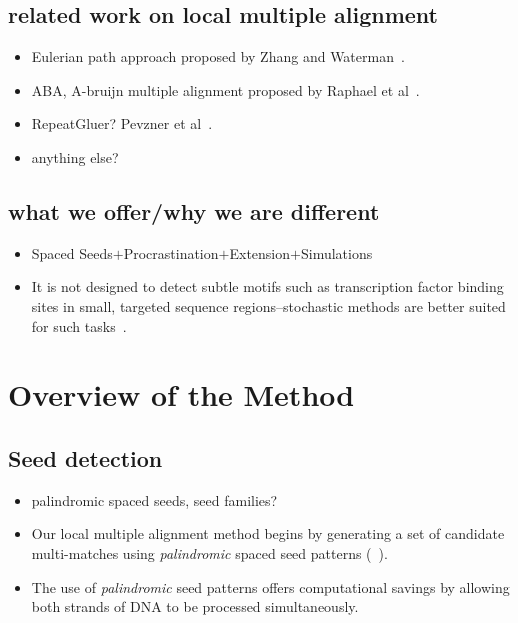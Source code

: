 \documentclass{llncs}
\begin{document}
\subsection{related work on local multiple alignment}
\begin{itemize}

\item Eulerian path approach proposed by Zhang and Waterman~\cite{ref-related1}. 

\item ABA, A-bruijn multiple alignment proposed by Raphael et al~\cite{ref-aba}. 

\item RepeatGluer? Pevzner et al~\cite{ref-repeatgluer}. 

\item anything else?


\end{itemize}
\subsection{what we offer/why we are different}
\begin{itemize}

\item Spaced Seeds$+$Procrastination$+$Extension$+$Simulations

\item It
is not designed to detect subtle motifs such as transcription factor
binding sites in small, targeted sequence regions--stochastic
methods are better suited for such tasks~\cite{ref-PhyloGibbs}. 


\end{itemize}
\section{Overview of the Method}\label{sec:overview}

\subsection{Seed detection}
\begin{itemize}

\item palindromic spaced seeds, seed families?

\item Our local multiple alignment method begins by generating
a set of candidate multi-matches using \textit{palindromic} spaced
seed patterns (~\cite{ref-procrast}).  

\item The use of
\textit{palindromic} seed patterns offers computational savings by
allowing both strands of DNA to be processed simultaneously.

\end{itemize}
\end{document}
